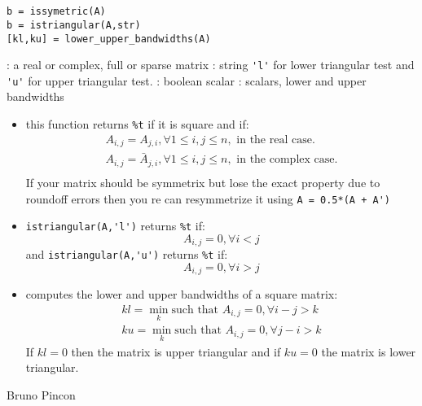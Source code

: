 
\begin{mandesc}
  \\
  \\
\end{mandesc}

\begin{calling_sequence}
\begin{verbatim}
b = issymetric(A)
b = istriangular(A,str)
[kl,ku] = lower_upper_bandwidths(A)
\end{verbatim}
\end{calling_sequence}
\begin{parameters}
  \begin{varlist}
    : a real or complex, full or sparse matrix
    : string \verb+'l'+ for lower triangular test and
    \verb+'u'+ for upper triangular test.
    : boolean scalar
    : scalars, lower and upper bandwidths
  \end{varlist}
\end{parameters}

\begin{mandescription}

\begin{itemize}
\item {} this function returns \verb+%t+ if it 
is square and if:
$$
\begin{array}{l}
   A_{i,j} = A_{j,i}, \forall 1 \le i,j \le n, \mbox{ in the real case.}\\
   A_{i,j} = \bar{A}_{j,i}, \forall 1 \le i,j \le n, \mbox{ in the complex case.}\\
\end{array}
$$
If your matrix should be symmetrix but lose the exact property due to
roundoff errors then you re can resymmetrize it using \verb-A = 0.5*(A + A')-

\item {} \verb+istriangular(A,'l')+ returns \verb+%t+ if:
$$
   A_{i,j} = 0, \forall i < j
$$ 
and  \verb+istriangular(A,'u')+ returns \verb+%t+ if:
$$
   A_{i,j} = 0, \forall i > j
$$

\item {} computes the lower and upper
  bandwidths of a square matrix:
$$
\begin{array}{l}
    kl = \min_k \mbox{such that } A_{i,j} = 0, \forall i-j > k \\
    ku = \min_k \mbox{such that } A_{i,j} = 0, \forall j-i > k 
\end{array}
$$
If $kl = 0$ then the matrix is upper triangular  and if $ku=0$ the
matrix is lower triangular.
\end{itemize}

\end{mandescription}



\begin{authors}
   Bruno Pincon
\end{authors}
